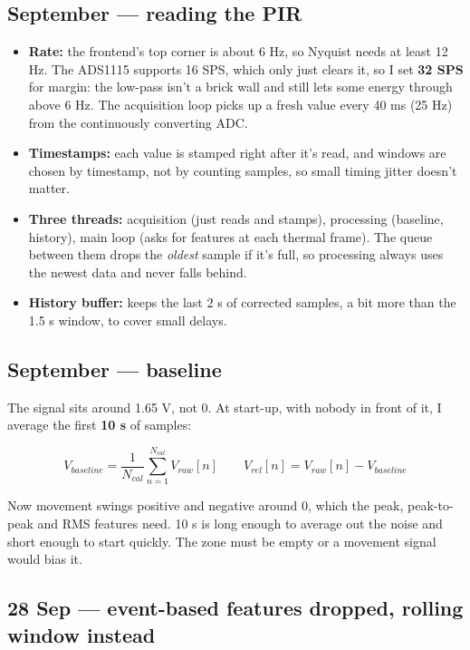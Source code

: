 \documentclass[11pt,a4paper]{article}
\providecommand{\tightlist}{\setlength{\itemsep}{0pt}\setlength{\parskip}{0pt}}
\begin{document}
\hypertarget{september-reading-the-pir}{%
\subsection{September ---
reading the
PIR}\label{september-reading-the-pir}}

\begin{itemize}
\tightlist
\item
  \textbf{Rate:} the
  frontend's top corner is
  about 6 Hz, so Nyquist needs
  at least 12 Hz. The ADS1115
  supports 16 SPS, which only
  just clears it, so I set
  \textbf{32 SPS} for margin:
  the low-pass isn't a brick
  wall and still lets some
  energy through above 6 Hz.
  The acquisition loop picks
  up a fresh value every 40 ms
  (25 Hz) from the
  continuously converting ADC.
\item
  \textbf{Timestamps:} each
  value is stamped right after
  it's read, and windows are
  chosen by timestamp, not by
  counting samples, so small
  timing jitter doesn't
  matter.
\item
  \textbf{Three threads:}
  acquisition (just reads and
  stamps), processing
  (baseline, history), main
  loop (asks for features at
  each thermal frame). The
  queue between them drops the
  \emph{oldest} sample if it's
  full, so processing always
  uses the newest data and
  never falls behind.
\item
  \textbf{History buffer:}
  keeps the last 2 s of
  corrected samples, a bit
  more than the 1.5 s window,
  to cover small delays.
\end{itemize}

\hypertarget{september-baseline}{%
\subsection{September ---
baseline}\label{september-baseline}}

The signal sits around 1.65 V,
not 0. At start-up, with
nobody in front of it, I
average the first \textbf{10
s} of samples:

\[
V_{baseline} = \frac{1}{N_{cal}}\sum_{n=1}^{N_{cal}} V_{raw}[n] \qquad V_{rel}[n] = V_{raw}[n] - V_{baseline}
\]

Now movement swings positive
and negative around 0, which
the peak, peak-to-peak and RMS
features need. 10 s is long
enough to average out the
noise and short enough to
start quickly. The zone must
be empty or a movement signal
would bias it.

\hypertarget{sep-event-based-features-dropped-rolling-window-instead}{%
\subsection{28 Sep ---
event-based features dropped,
rolling window
instead}\label{sep-event-based-features-dropped-rolling-window-instead}}
\end{document}
